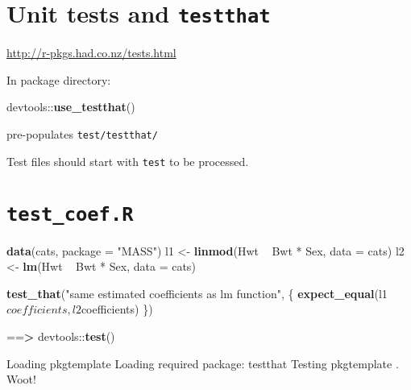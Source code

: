 \documentclass[]{book}
\newenvironment{Shaded}{\begin{snugshade}}{\end{snugshade}}
\newcommand{\KeywordTok}[1]{\textcolor[rgb]{0.13,0.29,0.53}{\textbf{{#1}}}}
\newcommand{\DataTypeTok}[1]{\textcolor[rgb]{0.13,0.29,0.53}{{#1}}}
\newcommand{\StringTok}[1]{\textcolor[rgb]{0.31,0.60,0.02}{{#1}}}
\newcommand{\ErrorTok}[1]{\textcolor[rgb]{0.64,0.00,0.00}{\textbf{{#1}}}}
\newcommand{\NormalTok}[1]{{#1}}
\theoremstyle{definition}
\theoremstyle{definition}
\theoremstyle{definition}
\theoremstyle{remark}
\begin{document}
\section{\texorpdfstring{Unit tests and
\texttt{testthat}}{Unit tests and testthat}}\label{unit-tests-and-testthat}

\url{http://r-pkgs.had.co.nz/tests.html}

In package directory:

\begin{Shaded}
\begin{Highlighting}[]
\NormalTok{devtools::}\KeywordTok{use_testthat}\NormalTok{()}
\end{Highlighting}
\end{Shaded}

pre-populates \texttt{test/testthat/}

Test files should start with \texttt{test} to be processed.

\section{\texorpdfstring{\texttt{test\_coef.R}}{test\_coef.R}}\label{test_coef.r}

\begin{Shaded}
\begin{Highlighting}[]
\KeywordTok{data}\NormalTok{(cats, }\DataTypeTok{package =} \StringTok{"MASS"}\NormalTok{)}
\NormalTok{l1 <-}\StringTok{ }\KeywordTok{linmod}\NormalTok{(Hwt ~}\StringTok{ }\NormalTok{Bwt *}\StringTok{ }\NormalTok{Sex, }\DataTypeTok{data =} \NormalTok{cats)}
\NormalTok{l2 <-}\StringTok{ }\KeywordTok{lm}\NormalTok{(Hwt ~}\StringTok{ }\NormalTok{Bwt *}\StringTok{ }\NormalTok{Sex, }\DataTypeTok{data =} \NormalTok{cats)}

\KeywordTok{test_that}\NormalTok{(}\StringTok{"same estimated coefficients as lm function"}\NormalTok{, \{}
  \KeywordTok{expect_equal}\NormalTok{(l1$coefficients, l2$coefficients)}
\NormalTok{\})}
\end{Highlighting}
\end{Shaded}

\begin{Shaded}
\begin{Highlighting}[]
\NormalTok{==}\ErrorTok{>}\StringTok{ }\NormalTok{devtools::}\KeywordTok{test}\NormalTok{()}

\NormalTok{Loading pkgtemplate}
\NormalTok{Loading required package:}\StringTok{ }\NormalTok{testthat}
\NormalTok{Testing pkgtemplate}
\NormalTok{.}
\NormalTok{Woot!}\StringTok{ }
\end{Highlighting}
\end{Shaded}
\end{document}

